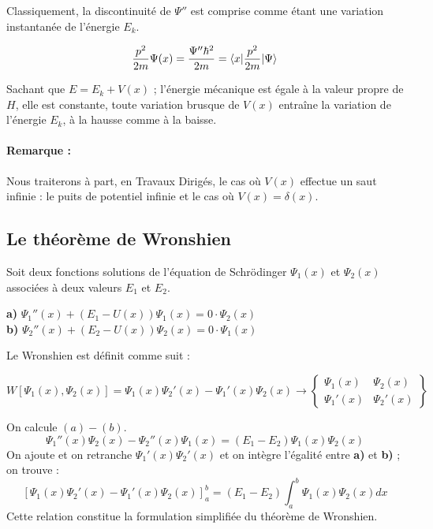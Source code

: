 \documentclass[12pt,a4paper,titlepage]{book}
\begin{document}
Classiquement, la discontinuité de $\Psi''$ est comprise comme étant une variation instantanée de l'énergie $E_k$.

\begin{equation*}
\frac{p^2}{2m} \Psi (x) = \frac{\Psi'' \hbar^2}{2m} = \braket{x \vert \frac{p^2}{2m} \vert \Psi}
\end{equation*}

Sachant que $E = E_k + V(x)$ ; l'énergie mécanique est égale à la valeur propre de $H$, elle est constante, toute variation brusque de $V(x)$ entraîne la variation de l'énergie $E_k$, à la hausse comme à la baisse.

\paragraph*{Remarque :} Nous traiterons à part, en Travaux Dirigés, le cas où $V(x)$ effectue un saut infinie : le puits de potentiel infinie et le cas où $V(x) = \delta (x)$. 

\subsection{Le théorème de Wronshien}

Soit deux fonctions solutions de l'équation de Schrödinger $\Psi_1 (x)$ et $\Psi_2 (x)$ associées à deux valeurs $E_1$ et $E_2$.
\begin{center}
\textbf{a)} $\Psi_1 '' (x) + (E_1 - U(x)) \Psi_1 (x) = 0 \cdot \Psi_2 (x)$\\

\textbf{b)} $\Psi_2 '' (x) + (E_2 - U(x)) \Psi_2 (x) = 0 \cdot \Psi_1 (x)$
\end{center}

Le Wronshien est définit comme suit : 
\begin{center}
\[
W [\Psi_1 (x) , \Psi_2 (x)] = \Psi_1 (x) \Psi_2 ' (x) - \Psi_1 ' (x) \Psi_2 (x) \longrightarrow
\left\lbrace
\begin{matrix}
\Psi_1 (x) & \Psi_2 (x)\\
\Psi_1 ' (x) & \Psi_2 ' (x)
\end{matrix}
\right\rbrace
\]
\end{center}
On calcule $(a) - (b)$.
\begin{equation*}
\Psi_1 '' (x) \Psi_2  (x) - \Psi_2 '' (x) \Psi_1 (x) = (E_1 - E_2) \Psi_1 (x) \Psi_2 (x)
\end{equation*}
On ajoute et on retranche $\Psi_1 ' (x) \Psi_2 ' (x)$ et on intègre l'égalité entre \textbf{a)} et \textbf{b)} ; on trouve :
\begin{equation*}
\left[ \Psi_1 (x) \Psi_2 ' (x) - \Psi_1 ' (x) \Psi_2 (x) \right]_a^b = (E_1 - E_2) \int_a^b \Psi_1 (x) \Psi_2 (x) dx
\end{equation*}
Cette relation constitue la formulation simplifiée du théorème de Wronshien.
\end{document}
